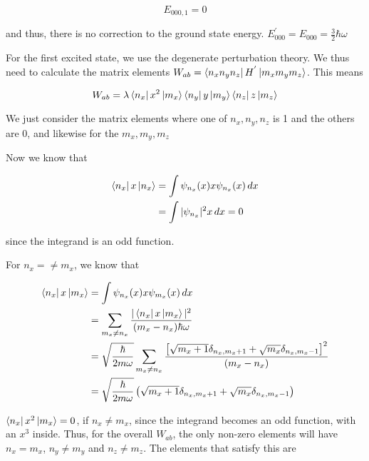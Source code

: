     \begin{equation*}
        E_{000,1} = 0
    \end{equation*}

    and thus, there is no correction to the ground state energy. $E^{'}_{000} = E_{000} = \frac{3}{2} \hbar \omega$

    For the first excited state, we use the degenerate perturbation theory. We thus need to calculate the matrix elements $W_{ab} = \bra{n_xn_yn_z}H^{'}\ket{m_xm_ym_z}$. This means

    \begin{equation*}
        W_{ab} = \lambda\bra{n_x}x^2\ket{m_x}\bra{n_y}y\ket{m_y}\bra{n_z}z\ket{m_z}
    \end{equation*}

    We just consider the matrix elements where one of $n_x , n_y , n_z$ is 1 and the others are 0, and likewise for the $m_x , m_y , m_z$

    Now we know that

    \begin{equation*}
        \begin{split}
            \bra{n_x}x\ket{n_x} & = \int \psi_{n_x}(x)x\psi_{n_x}(x) \, dx \\
            & = \int |\psi_{n_x}|^2 x \, dx = 0
        \end{split}
    \end{equation*}

    since the integrand is an odd function.

    For $n_x = \neq m_x$, we know that

    \begin{equation*}
        \begin{split}
            \bra{n_x}x\ket{m_x} & = \int \psi_{n_x}(x)x\psi_{m_x}(x) \, dx \\
            & = \sum_{m_x \neq n_x} \frac{|\bra{n_x}x\ket{m_x}|^2}{(m_x - n_x) \hbar\omega} \\
            & = \sqrt{\frac{\hbar}{2m\omega}} \sum_{m_x \neq n_x} \frac{\left[ \sqrt{m_x + 1}\delta_{n_x, m_x + 1} + \sqrt{m_x}\delta_{n_x, m_x - 1} \right]^2}{(m_x - n_x)} \\
            & = \sqrt{\frac{\hbar}{2m\omega}} \left( \sqrt{m_x + 1}\delta_{n_x, m_x + 1} + \sqrt{m_x}\delta_{n_x, m_x - 1} \right)
        \end{split}
    \end{equation*}

    $\bra{n_x}x^2\ket{m_x} = 0$, if $n_x \neq m_x$, since the integrand becomes an odd function, with an $x^3$ inside. Thus, for the overall $W_{ab}$, the only non-zero elements will have $n_x = m_x$, $n_y \neq m_y$ and $n_z \neq m_z$. The elements that satisfy this are 

